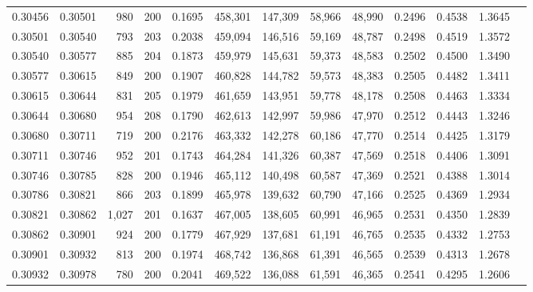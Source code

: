 \begin{tabular}{rrrrrrrrrrrrr}
0.30456 & 0.30501 &   980 & 200 &                                     0.1695 & 458,301 & 147,309 &  58,966 &  48,990 & 0.2496 & 0.4538 & 1.3645 \\
0.30501 & 0.30540 &   793 & 203 &                                     0.2038 & 459,094 & 146,516 &  59,169 &  48,787 & 0.2498 & 0.4519 & 1.3572 \\
0.30540 & 0.30577 &   885 & 204 &                                     0.1873 & 459,979 & 145,631 &  59,373 &  48,583 & 0.2502 & 0.4500 & 1.3490 \\
0.30577 & 0.30615 &   849 & 200 &                                     0.1907 & 460,828 & 144,782 &  59,573 &  48,383 & 0.2505 & 0.4482 & 1.3411 \\
0.30615 & 0.30644 &   831 & 205 &                                     0.1979 & 461,659 & 143,951 &  59,778 &  48,178 & 0.2508 & 0.4463 & 1.3334 \\
0.30644 & 0.30680 &   954 & 208 &                                     0.1790 & 462,613 & 142,997 &  59,986 &  47,970 & 0.2512 & 0.4443 & 1.3246 \\
0.30680 & 0.30711 &   719 & 200 &                                     0.2176 & 463,332 & 142,278 &  60,186 &  47,770 & 0.2514 & 0.4425 & 1.3179 \\
0.30711 & 0.30746 &   952 & 201 &                                     0.1743 & 464,284 & 141,326 &  60,387 &  47,569 & 0.2518 & 0.4406 & 1.3091 \\
0.30746 & 0.30785 &   828 & 200 &                                     0.1946 & 465,112 & 140,498 &  60,587 &  47,369 & 0.2521 & 0.4388 & 1.3014 \\
0.30786 & 0.30821 &   866 & 203 &                                     0.1899 & 465,978 & 139,632 &  60,790 &  47,166 & 0.2525 & 0.4369 & 1.2934 \\
0.30821 & 0.30862 & 1,027 & 201 &                                     0.1637 & 467,005 & 138,605 &  60,991 &  46,965 & 0.2531 & 0.4350 & 1.2839 \\
0.30862 & 0.30901 &   924 & 200 &                                     0.1779 & 467,929 & 137,681 &  61,191 &  46,765 & 0.2535 & 0.4332 & 1.2753 \\
0.30901 & 0.30932 &   813 & 200 &                                     0.1974 & 468,742 & 136,868 &  61,391 &  46,565 & 0.2539 & 0.4313 & 1.2678 \\
0.30932 & 0.30978 &   780 & 200 &                                     0.2041 & 469,522 & 136,088 &  61,591 &  46,365 & 0.2541 & 0.4295 & 1.2606 \\

\end{tabular}
